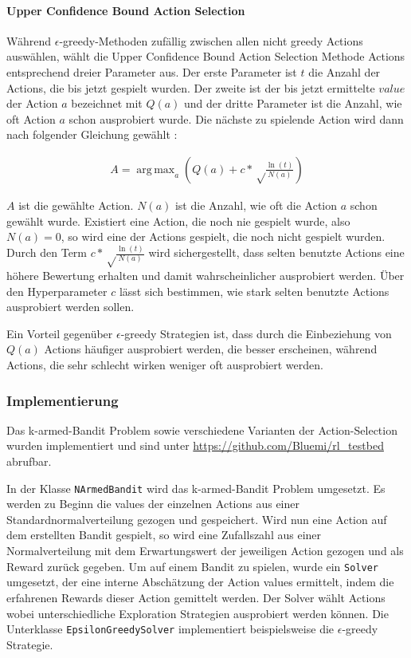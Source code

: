 \documentclass[11pt]{scrartcl}
\DeclareMathOperator*{\argmax}{arg\,max}
\begin{document}
\paragraph{Upper Confidence Bound Action Selection}
Während $\epsilon$-greedy-Methoden zufällig zwischen allen nicht greedy Actions
auswählen, wählt die Upper Confidence Bound Ac\-tion Selection Methode Actions entsprechend
dreier Parameter aus.
Der erste Parameter ist $t$ die Anzahl der Actions, die bis jetzt gespielt wurden. Der
zweite ist der bis jetzt ermittelte $value$ der Action $a$ bezeichnet mit $Q(a)$ und der
dritte Parameter ist die Anzahl, wie oft Action $a$ schon ausprobiert wurde. Die nächste
zu spielende Action wird dann nach folgender Gleichung gewählt \cite[~S.27]{SB1998}:

\begin{align}
  A = \argmax_a\left( Q(a) + c*\sqrt\frac{\ln(t)}{N(a)} \right)
\end{align}

$A$ ist die gewählte Action. $N(a)$ ist die Anzahl, wie oft die Action $a$ schon gewählt
wurde. Existiert eine Action, die noch nie gespielt wurde, also $N(a)=0$, so wird eine der
Actions gespielt, die noch nicht gespielt wurden. Durch den Term
$c*\sqrt\frac{\ln(t)}{N(a)}$ wird sichergestellt, dass selten benutzte Actions eine höhere
Bewertung erhalten und damit wahrscheinlicher ausprobiert werden. Über den Hyperparameter
$c$ lässt sich bestimmen, wie stark selten benutzte Actions ausprobiert werden sollen.

Ein Vorteil gegenüber $\epsilon$-greedy Strategien ist, dass durch die Einbeziehung von
$Q(a)$ Actions häufiger ausprobiert werden, die besser erscheinen, während Actions, die
sehr schlecht wirken weniger oft ausprobiert werden.

\subsubsection{Implementierung}
Das k-armed-Bandit Problem sowie verschiedene Varianten der Action-Selection wurden
implementiert und sind unter \url{https://github.com/Bluemi/rl_testbed} abrufbar.

In der Klasse \lstinline!NArmedBandit! wird das k-armed-Bandit Problem umgesetzt. Es
werden zu Beginn die values der einzelnen Actions aus einer Standardnormalverteilung
gezogen und gespeichert. Wird nun eine Action auf dem erstellten Bandit gespielt, so wird
eine Zufallszahl aus einer Normalverteilung mit dem Erwartungswert der jeweiligen Action
gezogen und als Reward zurück gegeben.
Um auf einem Bandit zu spielen, wurde ein \lstinline!Solver! umgesetzt, der eine interne
Abschätzung der Action values ermittelt, indem die erfahrenen Rewards dieser Action
gemittelt werden. Der Solver wählt Actions wobei unterschiedliche Exploration Strategien
ausprobiert werden können. Die Unterklasse \lstinline!EpsilonGreedySolver! implementiert
beispielsweise die $\epsilon$-greedy Strategie.
\end{document}

